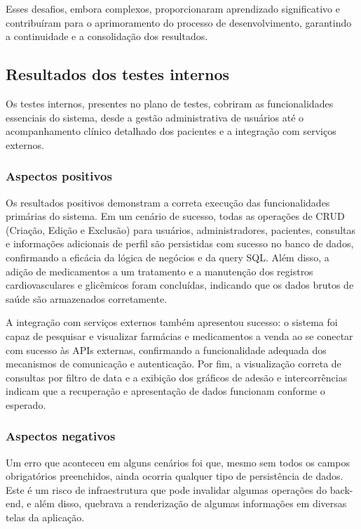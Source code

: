 \documentclass[
	article,			%
	12pt,				%
	oneside,			%
	a4paper,			%
    BIBLATEX,           %
	english,			%
	brazil,				%
	sumario=tradicional
	]{abntex2}
\begin{document}
Esses desafios, embora complexos, proporcionaram aprendizado significativo e contribuíram para o aprimoramento do processo de desenvolvimento, garantindo a continuidade e a consolidação dos resultados.

\subsection {Resultados dos testes internos}

Os testes internos, presentes no plano de testes, cobriram as funcionalidades essenciais do sistema, desde a gestão administrativa de usuários até o acompanhamento clínico detalhado dos pacientes e a integração com serviços externos.

\subsubsection{Aspectos positivos}
Os resultados positivos demonstram a correta execução das funcionalidades primárias do sistema. Em um cenário de sucesso, todas as operações de CRUD (Criação, Edição e Exclusão) para usuários, administradores, pacientes, consultas e informações adicionais de perfil são persistidas com sucesso no banco de dados, confirmando a eficácia da lógica de negócios e da query SQL. Além disso, a adição de medicamentos a um tratamento e a manutenção dos registros cardiovasculares e glicêmicos foram concluídas, indicando que os dados brutos de saúde são armazenados corretamente.

A integração com serviços externos também apresentou sucesso: o sistema foi capaz de pesquisar e visualizar farmácias e medicamentos a venda ao se conectar com sucesso às APIs externas, confirmando a funcionalidade adequada dos mecanismos de comunicação e autenticação. Por fim, a visualização correta de consultas por filtro de data e a exibição dos gráficos de adesão e intercorrências indicam que a recuperação e apresentação de dados funcionam conforme o esperado.

\subsubsection{Aspectos negativos}

Um erro que aconteceu em alguns cenários foi que, mesmo sem todos os campos obrigatórios preenchidos, ainda ocorria qualquer tipo de persistência de dados. Este é um risco de infraestrutura que pode invalidar algumas operações do back-end, e além disso, quebrava a renderização de algumas informações em diversas telas da aplicação.
\end{document}
